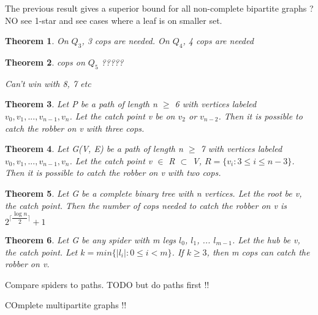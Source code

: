 \documentclass{article}
\newtheorem{theorem}{Theorem}[section]
\newenvironment{proof}[1][Proof]{\begin{trivlist}
\item[\hskip \labelsep {\bfseries #1}]}{\end{trivlist}}
\begin{document}
The previous result gives a superior bound for all non-complete bipartite graphs ? NO see 1-star and see cases where a leaf is on smaller set.
\begin{theorem}
On $Q_3$, 3 cops are needed. On $Q_4$, 4 cops are needed 
\end{theorem}
\begin{theorem} cops on $Q_5$ ?????

Can't win with 8, 7 etc
\end{theorem}
\begin{theorem}
\label{path-distance-2}
Let P be a path of length n $\ge$ 6 with vertices labeled $v_0, v_1, ... , v_{n-1}, v_n $. Let the catch point v be on $v_2$ or $v_{n-2}$. Then it is possible to catch the robber on v with three cops.
\end{theorem}
\begin{theorem}
\label{path_general}
Let G(V, E) be a path of length n $\ge$ 7 with vertices labeled $v_0, v_1, ... , v_{n-1}, v_n $. Let the catch point v $\in$ R $\subset$ V, $R = \{v_{i} : 3 \le i \le n-3\}$. Then it is possible to catch the robber on v with two cops.
\end{theorem}
\begin{theorem}
Let G be a complete binary tree with n vertices. Let the root be v, the catch point. Then the number of cops needed to catch the robber on v is $2^{\lceil{\dfrac{\log n}{2}}\rceil}+1$
\end{theorem}
\begin{theorem}

Let G be any spider with m legs $l_0$, $l_1$, ... $l_{m-1}$. Let the hub be v, the catch point. Let $k = min\{ \left\vert l_i \right\vert : 0 \le i < m \}$. If $k \ge 3$, then m cops can catch the robber on v.
\end{theorem}
\begin{proof}
Compare spiders to paths. TODO but do paths first !!

\end{proof}
COmplete multipartite graphs !!
\end{document}
